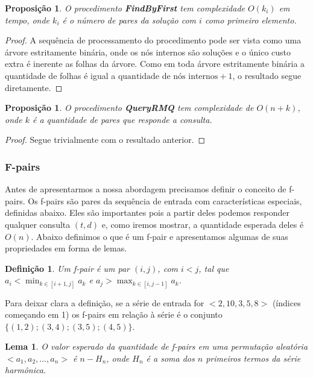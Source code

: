 \documentclass[12pt]{article}
\newtheorem{lem}[thm]{Lema}
\newtheorem{prop}[thm]{Proposição}
\newtheorem{defi}[thm]{Definição}
\begin{document}
\begin{prop}
O procedimento {\bf FindByFirst} tem complexidade $O(k_i)$ em tempo,
onde $k_i$ é o número de pares da solução com $i$ como primeiro elemento.
\end{prop}  
\begin{proof}
A sequência de processamento do procedimento pode ser vista
como uma árvore estritamente binária, onde os nós internos são soluções e o único
custo extra é inerente as folhas da árvore. Como em toda
árvore estritamente binária a quantidade de folhas é igual a $\text{quantidade de nós internos} + 1$,
o resultado segue diretamente.
\end{proof} 

\begin{prop}
O procedimento {\bf QueryRMQ} tem complexidade de $O(n + k)$,
onde $k$ é a quantidade de pares que responde a consulta.
\end{prop}

\begin{proof}
Segue trivialmente com o resultado anterior.
\end{proof} 

\subsubsection{F-pairs}

Antes de apresentarmos a nossa abordagem precisamos definir 
o conceito de f-pairs. Os f-pairs são pares da sequência de entrada
com características especiais, definidas abaixo. Eles são importantes pois
a partir deles podemos responder qualquer consulta $(t, d)$ e,
como iremos mostrar, a quantidade esperada deles é $O(n)$. 
Abaixo definimos o que é um f-pair e apresentamos algumas de suas propriedades
em forma de lemas.

\begin{defi}
Um f-pair é um par $(i, j)$, com $i < j$, tal que $a_i < \min_{k \in [i + 1, j]} a_k$ e $a_j > \max_{k \in [i, j -1]} a_k$.
\end{defi}
Para deixar clara a definição, se a série de entrada for $<2, 10, 3, 5, 8>$ (índices começando em 1) os f-pairs
em relação à série é o conjunto $\{(1, 2); (3, 4); (3, 5); (4, 5) \}$. 

\begin{lem}
O valor esperado da quantidade de f-pairs em uma
permutação aleatória $<a_1, a_2, \ldots, a_n>$ é $n - H_n$, onde
$H_n$ é a soma dos $n$ primeiros termos da série harmônica.
\label{amountf}
\end{lem}
\end{document}
